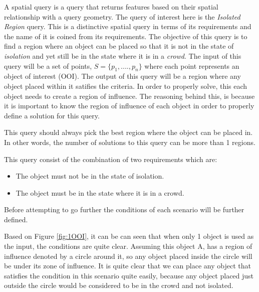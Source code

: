 \documentclass[a4paper,11pt]{article}
\begin{document}
A spatial query is a query that returns features based on their spatial relationship with a query geometry. The query of interest here is the \textit{Isolated Region} query. This is a distinctive spatial query in terms of its requirements and the name of it is coined from its requirements. The objective of this query is to find a region where an object can be placed so that it is not in the state of \textit{isolation} and yet still be in the state where it is in a \textit{crowd}. The input of this query will be a set of points, $S = \{p_1,....,p_n\}$ where each point represents an object of interest (OOI). The output of this query will be a region where any object placed within it satifies the criteria. In order to properly solve, this each object needs to create a region of influence. The reasoning behind this, is because it is important to know the region of influence of each object in order to properly define a solution for this query.

This query should always pick the best region where the object can be placed in. In other words, the number of solutions to this query can be more than 1 regions. 

This query consist of the combination of two requirements which are:
\begin{itemize}
	\item The object must not be in the state of isolation.
	\item The object must be in the state where it is in a crowd.
\end{itemize}

Before attempting to go further the conditions of each scenario will be further defined. 

Based on Figure \ref{fig:1OOI}, it can be can seen that when only 1 object is used as the input, the conditions are quite clear. Assuming this object A, has a region of influence denoted by a circle around it, so any object placed inside the circle will be under its zone of influence. It is quite clear that we can place any object that satisfies the condition in this scenario quite easily, because any object placed just outside the circle would be considered to be in the crowd and not isolated. 
\end{document}
